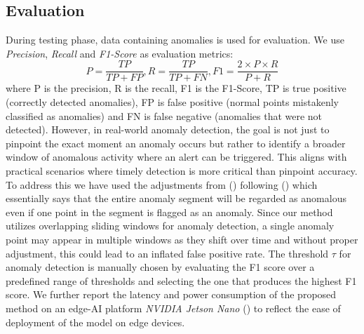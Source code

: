 \subsection{Evaluation}
During testing phase, data containing anomalies is used for evaluation. We use {\em Precision}, {\em Recall} and {\em F1-Score} as evaluation metrics:
\begin{equation}
    P = \frac{TP}{TP+FP}, R=\frac{TP}{TP+FN}, F1=\frac{2 \times P \times R}{P+R} \nonumber
    \label{p}
\end{equation}
where P is the precision, R is the recall, F1 is the F1-Score, TP is true positive (correctly detected anomalies), FP is false positive (normal points mistakenly classified as anomalies) and FN is false negative (anomalies that were not detected). However, in real-world anomaly detection, the goal is not just to pinpoint the exact moment an anomaly occurs but rather to identify a broader window of anomalous activity where an alert can be triggered. This aligns with practical scenarios where timely detection is more critical than pinpoint accuracy. To address this we have used the adjustments from (\cite{tsvae}) following (\cite{eval}) which essentially says that the entire anomaly segment will be regarded as anomalous even if one point in the segment is flagged as an anomaly. Since our method utilizes overlapping sliding windows for anomaly detection, a single anomaly point may appear in multiple windows as they shift over time and without proper adjustment, this could lead to an inflated false positive rate. The threshold $\tau$ for anomaly detection is manually chosen by evaluating the F1 score over a predefined range of thresholds and selecting the one that produces the highest F1 score. We further report the latency and power consumption  of the proposed method on an edge-AI platform \emph{NVIDIA Jetson Nano} (\cite{jetson}) to reflect the ease of deployment of the model on edge devices.




